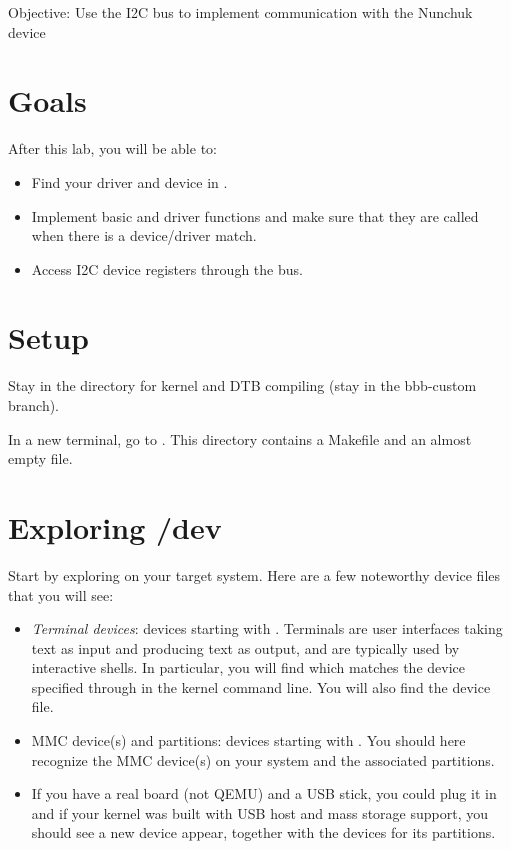 {Objective: Use the I2C bus to implement communication with the Nunchuk device}

\section{Goals}

After this lab, you will be able to:
\begin{itemize}
\item Find your driver and device in .
\item Implement basic  and  driver
  functions and make sure that they are called when there is a
  device/driver match.
\item Access I2C device registers through the bus.
\end{itemize}

\section{Setup}

Stay in the  directory for kernel and DTB
compiling (stay in the  
{bbb-custom}{} 
branch).

In a new terminal, go to
.  This directory
contains a Makefile and an almost empty  file.

\section{Exploring /dev}

Start by exploring  on your target system. Here are a few
noteworthy device files that you will see:

\begin{itemize}
 \item {\em Terminal devices}: devices starting with .
       Terminals are user interfaces taking text as
       input and producing text as output, and are typically used by
       interactive shells. In particular, you will find
        which matches the device specified through
        in the kernel command line. You will also find
       the {\tt \ttyname} device file.
 \item {MMC device(s) and partitions}: devices starting with
       . You should here recognize the MMC device(s)
       on your system and the associated partitions.
 \item If you have a real board (not QEMU) and a USB stick, you could
       plug it in and if your kernel was built with USB host and mass
       storage support, you should see a new  device appear,
       together with the  devices for its partitions.
\end{itemize}


